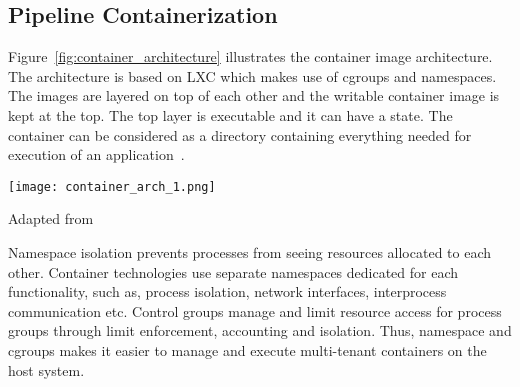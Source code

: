 



\subsection{Pipeline Containerization}
Figure~\ref{fig:container_architecture} illustrates the container image 
architecture. %
The architecture is based on LXC which makes use of cgroups and namespaces. The images are layered 
on top of each other and the writable container image is kept at the 
top. The top layer is executable and it can have a state. The container 
can be considered as a directory containing everything needed for 
execution of an application~\cite{7158965}.\\

\begin{center}
\texttt{[image: container\_arch\_1.png]}
\caption*{Adapted from \cite{7158965}}
\label{fig:container_architecture}
\end{center}

Namespace isolation prevents processes from seeing resources allocated to each other. Container technologies use separate namespaces dedicated for each functionality, such as, process isolation, network interfaces, interprocess communication etc. Control groups manage and limit resource access for process groups through limit enforcement, accounting and isolation. Thus, namespace and cgroups makes it easier to manage and execute multi-tenant containers on the host system.

